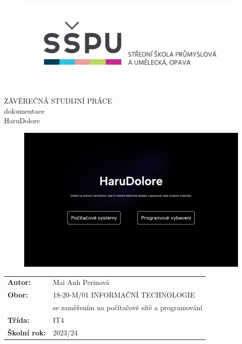 \documentclass[12pt, a4paper,
oneside,      %
openright
]{report}
\title{\nazevPrace} %
\author{\jmenoAutora} %
\date{\datumOdevzdani} %
\newcommand\obor{INFORMAČNÍ TECHNOLOGIE} %
\newcommand\kodOboru{18-20-M/01} %
\newcommand\zamereni{se zaměřením na počítačové sítě a programování} %
\newcommand\trida{IT4} %
\newcommand\jmenoAutora{Mai Anh Perinová}  %
\newcommand\skolniRok{2023/24} %
\newcommand\nazevPrace{HaruDolore} %
\begin{document}
	
	\pagestyle{empty}
	
	\cleardoublepage

	
	{\selectfont
		\begin{figure}[h]
			\centering
			\includegraphics[width=0.6\linewidth]{image/logo-skoly.png} 
		\end{figure}
		
		
		{\bfseries %
			\begin{center}
				\vspace{0.025 \textheight}
				\LARGE{ZÁVĚREČNÁ STUDIJNÍ PRÁCE}\\
				\large{dokumentace}\\
				\vspace{0.075 \textheight}
				\LARGE {\nazevPrace}\\
			\end{center}  
		}%
		
		\begin{figure}[h]
			\centering
			\includegraphics[width=0.8\linewidth]{image/homepage.png} 
		\end{figure}
		
		\vspace{0.02 \textheight}
		\begin{table}[h!]
			\begin{tabular}{ll}
				\textbf{Autor:} & \jmenoAutora\\ 
				\textbf{Obor:} & \kodOboru { } \obor\\
				\textbf{} & \zamereni\\
				\textbf{Třída:} & \trida\\
				\textbf{Školní rok:} & \skolniRok\\
			\end{tabular}
			
		\end{table}		
	}
	
\end{document}

